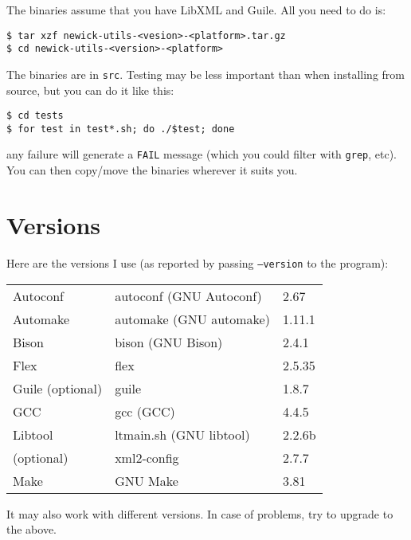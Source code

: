 The binaries assume that you have LibXML and Guile.
All you need to do is:

\begin{verbatim}
$ tar xzf newick-utils-<vesion>-<platform>.tar.gz
$ cd newick-utils-<version>-<platform>
\end{verbatim}

\noindent{}The binaries are in \texttt{src}. Testing may be less important than
when installing from source, but you can do it like this:

\begin{verbatim}
$ cd tests
$ for test in test*.sh; do ./$test; done 
\end{verbatim}

\noindent{}any failure will generate a \texttt{FAIL} message (which you could filter with \texttt{grep}, etc).  You can then copy/move the binaries wherever it suits you.


\section{Versions}
\label{sct:versions}

\noindent{}Here are the versions I use (as reported by passing
\texttt{--version} to the program):

\begin{tabular}{lll}
Autoconf					& autoconf (GNU Autoconf) & 2.67 \\
Automake					& automake (GNU automake) & 1.11.1 \\
Bison  						& bison (GNU Bison) 			& 2.4.1 \\ 
Flex							& flex 										& 2.5.35 \\
Guile	(optional)	& guile										& 1.8.7 \\
GCC 							& gcc (GCC) 							& 4.4.5 \\
Libtool						& ltmain.sh (GNU libtool) & 2.2.6b \\
\libxml{} (optional)	& xml2-config							& 2.7.7 \\ 
Make							& GNU Make 								& 3.81
\end{tabular}

It may also work with different versions. In case of problems, try to upgrade to
the above.
